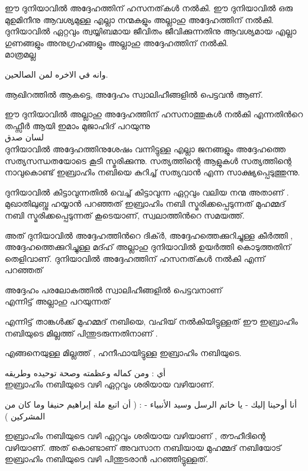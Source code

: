 ഈ ദുനിയാവിൽ അദ്ദേഹത്തിന് ഹസനത്‌കൾ നൽകി. 
ഈ ദുനിയാവിൽ ഒരു മുഉമിനീനു  ആവശ്യമുള്ള എല്ലാ നന്മകളും അല്ലാഹു അദ്ദേഹത്തിന് നൽകി. ദുനിയാവിൽ ഏറ്റവും ത്വയ്യിബമായ ജീവിതം ജീവിക്കുന്നതിനു ആവശ്യമായ എല്ലാ ഗുണങ്ങളും അനുഗ്രഹങ്ങളും അല്ലാഹു അദ്ദേഹത്തിന് നൽകി. \\

 മാത്രമല്ല 

\textarabic{وانه في الاخره لمن الصالحين.} 

ആഖിറത്തിൽ ആകട്ടെ, അദ്ദേഹം  സ്വാലിഹീങ്ങളിൽ പെട്ടവൻ ആണ്. 

ഈ ദുനിയാവിൽ അല്ലാഹു അദ്ദേഹത്തിന് ഹസനാത്തുകൾ നൽകി എന്നതിൻറെ തഫ്സീർ ആയി ഇമാം മുജാഹിദ് പറയുന്നു \\

\textarabic{ لسان صدق} \\


ദുനിയാവിൽ അദ്ദേഹത്തിനുശേഷം വന്നിട്ടുള്ള എല്ലാ ജനങ്ങളും അദ്ദേഹത്തെ സത്യസന്ധതയോടെ കൂടി സ്മരിക്കുന്നു. 
സത്യത്തിന്റെ ആളുകൾ സത്യത്തിന്റെ നാവുകൊണ്ട് ഇബ്രാഹിം നബിയെ കുറിച്ച് സത്യവാൻ എന്ന സാക്ഷ്യപ്പെടുത്തുന്നു. 

ദുനിയാവിൽ കിട്ടാവുന്നതിൽ വെച്ച് കിട്ടാവുന്ന ഏറ്റവും വലിയ നന്മ അതാണ് . \\

മുഖാതിലുബ്നു ഹയ്യാൻ പറഞ്ഞത് 
ഇബ്രാഹിം നബി സ്മരിക്കപ്പെടുന്നത് മുഹമ്മദ് നബി സ്മരിക്കപ്പെടുന്നത് കൂടെയാണ്, സ്വലാത്തിൻറെ സമയത്ത്. 

അത്  ദുനിയാവിൽ അദ്ദേഹത്തിൻറെ ദിക്ർ,  അദ്ദേഹത്തെക്കുറിച്ചുള്ള കീർത്തി , അദ്ദേഹത്തെക്കുറിച്ചുള്ള മദ്ഹ് അല്ലാഹു 
ദുനിയാവിൽ 
ഉയർത്തി കൊടുത്തതിന് തെളിവാണ്.  ദുനിയാവിൽ അദ്ദേഹത്തിന് ഹസനത്‌കൾ  നൽകി എന്ന് പറഞ്ഞത് 


അദ്ദേഹം പരലോകത്തിൽ സ്വാലിഹീങ്ങളിൽ പെട്ടവനാണ് \\

എന്നിട്ട് അല്ലാഹു പറയുന്നത് 

    \textarabic{\quranayah[16][123]} 
എന്നിട്ട് താങ്കൾക്ക് മുഹമ്മദ് നബിയെ,  വഹിയ് നൽകിയിട്ടുള്ളത് ഈ ഇബ്രാഹിം നബിയുടെ മില്ലത്ത് പിന്തുടരുന്നതിനാണ് . 

എങ്ങനെയുള്ള മില്ലത്ത് , ഹനീഫായിട്ടുള്ള ഇബ്രാഹിം നബിയുടെ. 

\textarabic{أي : ومن كماله وعظمته وصحة توحيده وطريقه} \\
ഇബ്രാഹിം നബിയുടെ വഴി ഏറ്റവും ശരിയായ വഴിയാണ്. 

\textarabic{ أنا أوحينا إليك - يا خاتم الرسل وسيد الأنبياء - : ( أن اتبع ملة إبراهيم حنيفا وما كان من المشركين )}

ഇബ്രാഹിം നബിയുടെ വഴി ഏറ്റവും ശരിയായ വഴിയാണ് , തൗഹീദിന്റെ വഴിയാണ്. അത് കൊണ്ടാണ് അവസാന നബിയായ മുഹമ്മദ് നബിയോട് ഇബ്രാഹിം നബിയുടെ വഴി പിന്തുടരാൻ പറഞ്ഞിട്ടുള്ളത്. \\

